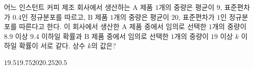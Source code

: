 어느 인스턴트 커피 제조 회사에서 생산하는 $\mathrm{A}$ 제품 $1$개의 중량은 평균이 $9$, 표준편차가 $0.4$인 정규분포를 따르고, $\mathrm{B}$ 제품 $1$개의 중량은 평균이 $20$, 표준편차가 $1$인 정규분포를 따른다고 한다. 이 회사에서 생산한 $\mathrm{A}$ 제품 중에서 임의로 선택한 $1$개의 중량이 $8.9$ 이상 $9.4$ 이하일 확률과 $\mathrm{B}$ 제품 중에서 임의로 선택한 $1$개의 중량이 $19$ 이상 $k$ 이하일 확률이 서로 같다. 상수 $k$의 값은? 
\begin{choices32}{$19.5$}{$19.75$}{$20$}{$20.25$}{$20.5$}\end{choices32}
